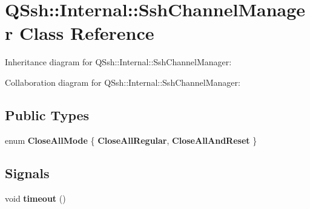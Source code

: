 \hypertarget{class_q_ssh_1_1_internal_1_1_ssh_channel_manager}{}\section{Q\+Ssh\+:\+:Internal\+:\+:Ssh\+Channel\+Manager Class Reference}
\label{class_q_ssh_1_1_internal_1_1_ssh_channel_manager}


Inheritance diagram for Q\+Ssh\+:\+:Internal\+:\+:Ssh\+Channel\+Manager\+:


Collaboration diagram for Q\+Ssh\+:\+:Internal\+:\+:Ssh\+Channel\+Manager\+:
\subsection*{Public Types}
\begin{DoxyCompactItemize}
\item 
\mbox{\label{class_q_ssh_1_1_internal_1_1_ssh_channel_manager_a0ff04266f0cc559744a028c08ac6cfa9}} 
enum {\bfseries Close\+All\+Mode} \{ {\bfseries Close\+All\+Regular}, 
{\bfseries Close\+All\+And\+Reset}
 \}
\end{DoxyCompactItemize}
\subsection*{Signals}
\begin{DoxyCompactItemize}
\item 
\mbox{\label{class_q_ssh_1_1_internal_1_1_ssh_channel_manager_ad39fff3dfa8fef43b3e30e94edc924a8}} 
void {\bfseries timeout} ()
\end{DoxyCompactItemize}
